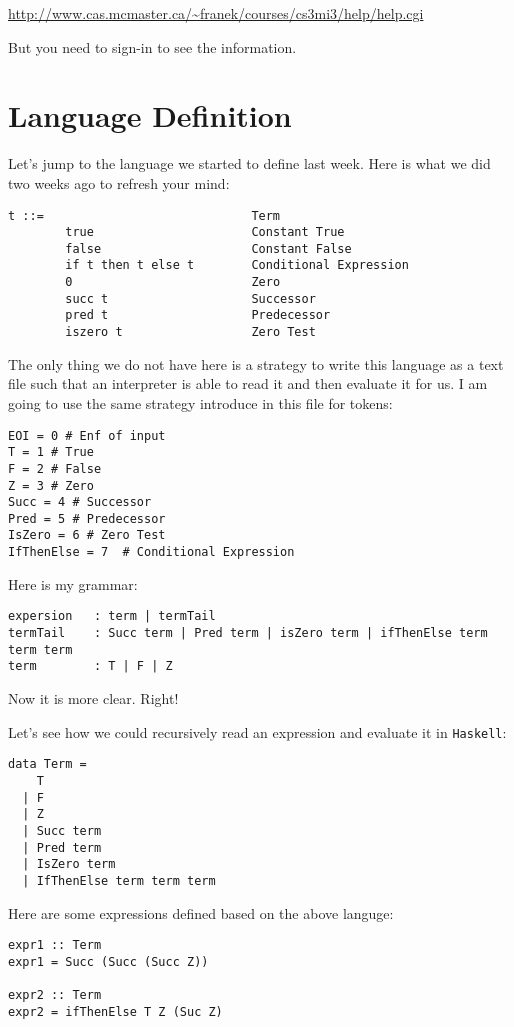 \documentclass[11pt]{article}
\begin{document}
\url{http://www.cas.mcmaster.ca/\~franek/courses/cs3mi3/help/help.cgi}

But you need to sign-in to see the information.

\section{Language Definition}
\label{sec:org55fefb1}


Let's jump to the language we started to define last week. Here is what we did
two weeks ago to refresh your mind:

\begin{verbatim}
t ::=                             Term
        true                      Constant True
        false                     Constant False
        if t then t else t        Conditional Expression
        0                         Zero
        succ t                    Successor
        pred t                    Predecessor
        iszero t                  Zero Test
\end{verbatim}

The only thing we do not have here is a strategy to write this language as a
text file such that an interpreter is able to read it and then evaluate it for
us. I am going to use the same strategy introduce in this file for tokens:

\begin{verbatim}
EOI = 0 # Enf of input
T = 1 # True
F = 2 # False
Z = 3 # Zero
Succ = 4 # Successor
Pred = 5 # Predecessor
IsZero = 6 # Zero Test
IfThenElse = 7  # Conditional Expression
\end{verbatim}

Here is my grammar:

\begin{verbatim}
expersion   : term | termTail
termTail    : Succ term | Pred term | isZero term | ifThenElse term term term
term        : T | F | Z
\end{verbatim}

Now it is more clear. Right!

Let's see how we could recursively read an expression and evaluate it in \texttt{Haskell}:

\begin{verbatim}
data Term =
    T
  | F
  | Z
  | Succ term 
  | Pred term
  | IsZero term
  | IfThenElse term term term
\end{verbatim}

Here are some expressions defined based on the above languge:

\begin{verbatim}
expr1 :: Term
expr1 = Succ (Succ (Succ Z))

expr2 :: Term
expr2 = ifThenElse T Z (Suc Z)
\end{verbatim}
\end{document}
